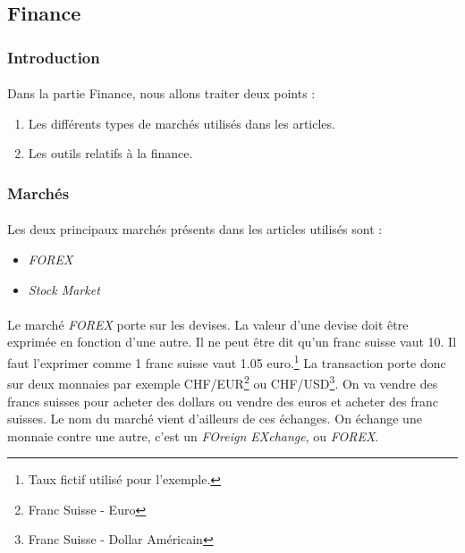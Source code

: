 \documentclass[a4paper, 11pt]{article}
\begin{document}
\subsection{Finance}
\subsubsection{Introduction}
\paragraph{}
Dans la partie Finance, nous allons traiter deux points :
\begin{enumerate}
\item Les différents types de marchés utilisés dans les articles.
\item Les outils relatifs à la finance.
\end{enumerate}

\subsubsection{Marchés}
\paragraph{}Les deux principaux marchés présents dans les articles utilisés sont :
\begin{itemize}
\item \textit{FOREX}
\item \textit{Stock Market}
\end{itemize}

\paragraph{}
Le marché \textit{FOREX} porte sur les devises. La valeur d'une devise doit être exprimée en fonction d'une autre. Il ne peut être dit qu'un franc suisse vaut 10. Il faut l'exprimer comme 1 franc suisse vaut 1.05 euro.\footnote{Taux fictif utilisé pour l'exemple.}
La transaction porte donc sur deux monnaies par exemple CHF/EUR\footnote{Franc Suisse - Euro} ou CHF/USD\footnote{Franc Suisse - Dollar Américain}. On va vendre des francs suisses pour acheter des dollars ou vendre des euros et acheter des franc suisses.
Le nom du marché vient d'ailleurs de ces échanges. On échange une monnaie contre une autre, c'est un \textit{FOreign EXchange}, ou \textit{FOREX}.
\end{document}
